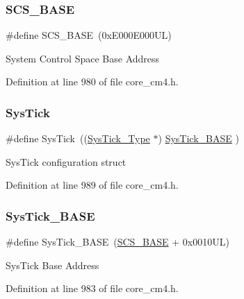 \subsubsection{\texorpdfstring{S\+C\+S\+\_\+\+B\+A\+SE}{SCS\_BASE}}
{\footnotesize\ttfamily \#define S\+C\+S\+\_\+\+B\+A\+SE~(0x\+E000\+E000\+U\+L)}

System Control Space Base Address 

Definition at line 980 of file core\+\_\+cm4.\+h.

\mbox{\label{group___c_m_s_i_s__core__register_gacd96c53beeaff8f603fcda425eb295de}} 
\subsubsection{\texorpdfstring{Sys\+Tick}{SysTick}}
{\footnotesize\ttfamily \#define Sys\+Tick~((\hyperlink{struct_sys_tick___type}{Sys\+Tick\+\_\+\+Type}   $\ast$)     \hyperlink{group___c_m_s_i_s__core__register_ga58effaac0b93006b756d33209e814646}{Sys\+Tick\+\_\+\+B\+A\+SE}  )}

Sys\+Tick configuration struct 

Definition at line 989 of file core\+\_\+cm4.\+h.

\mbox{\label{group___c_m_s_i_s__core__register_ga58effaac0b93006b756d33209e814646}} 
\subsubsection{\texorpdfstring{Sys\+Tick\+\_\+\+B\+A\+SE}{SysTick\_BASE}}
{\footnotesize\ttfamily \#define Sys\+Tick\+\_\+\+B\+A\+SE~(\hyperlink{group___c_m_s_i_s__core__register_ga3c14ed93192c8d9143322bbf77ebf770}{S\+C\+S\+\_\+\+B\+A\+SE} +  0x0010\+U\+L)}

Sys\+Tick Base Address 

Definition at line 983 of file core\+\_\+cm4.\+h.

